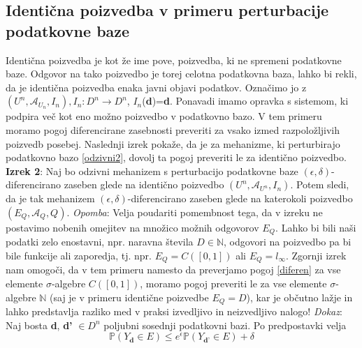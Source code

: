 \documentclass[mat1]{article}
\theoremstyle{definition}
\begin{document}
\subsection{Identična poizvedba v primeru perturbacije podatkovne baze}
Identična poizvedba je kot že ime pove, poizvedba, ki ne spremeni podatkovne baze. Odgovor na tako poizvedbo je torej celotna podatkovna baza, lahko bi rekli, da je identična poizvedba enaka javni objavi podatkov. Označimo jo z $(U^n, \mathcal{A}_{U_n}, I_n), I_n : D^n \rightarrow D^n$, $I_n$(\textbf{d})=\textbf{d}. 
\newline
\newline
Ponavadi imamo opravka s sistemom, ki podpira več kot eno možno poizvedbo v podatkovno bazo. V tem primeru moramo pogoj diferencirane zasebnosti preveriti za vsako izmed razpoložljivih poizvedb posebej. Naslednji izrek pokaže, da je za mehanizme, ki perturbirajo podatkovno bazo \eqref{odzivni2}, dovolj ta pogoj preveriti le za identično poizvedbo.
\newline
\newline
\textbf{Izrek 2}: Naj bo odzivni mehanizem s perturbacijo podatkovne baze  $(\epsilon , \delta)$-diferencirano zaseben glede na identično poizvedbo $(U^n, \mathcal{A}_{U^n}, I_n)$. Potem sledi, da je tak mehanizem $(\epsilon , \delta)$-diferencirano zaseben glede na katerokoli poizvedbo $(E_Q, \mathcal{A}_Q, Q)$.
\newline
\newline
\textit{Opomba}: Velja poudariti pomembnost tega, da v izreku ne postavimo nobenih omejitev na množico možnih odgovorov $E_Q$.  Lahko bi bili naši podatki zelo enostavni, npr. naravna števila $D \in \mathbb{N}$, odgovori na poizvedbo pa bi bile funkcije ali zaporedja, tj. npr. $E_Q = C([0,1])$ ali $E_Q = l_\infty$. Zgornji izrek nam omogoči, da v tem primeru namesto da preverjamo pogoj \eqref{diferen} za vse elemente $\sigma$-algebre $C([0,1])$, moramo pogoj preveriti le za vse elemente $\sigma$-algebre $\mathbb{N}$ (saj je v primeru identične poizvedbe $E_Q=D$), kar je občutno lažje in lahko predstavlja razliko med v praksi izvedljivo in neizvedljivo nalogo!
\newline
\newline
\textit{Dokaz}: Naj bosta \textbf{d}, \textbf{d'} $\in D^n$ poljubni sosednji podatkovni bazi. Po predpostavki velja 
\begin{equation}\label{star}
\mathbb{P}(Y_{\textbf{d}} \in E) \leq e^\epsilon \mathbb{P}(Y_{\textbf{d'}} \in E) + \delta \tag {*}
\end{equation}
\end{document}
